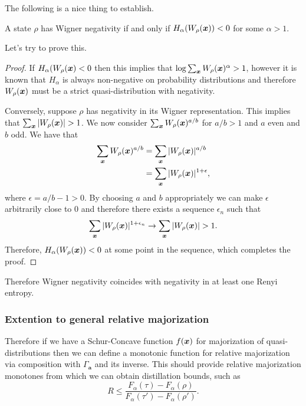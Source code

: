 \documentclass[pra,
aps,
twocolumn,
superscriptaddress,
groupedaddress,
nofootinbib,
reprint
]{revtex4-1}
\begin{document}
The following is a nice thing to establish.
\begin{theorem} A state $\rho$ has Wigner negativity if and only if $H_\alpha (W_\rho (\boldsymbol{x})) < 0$ for some $\alpha >1$.
\end{theorem}
Let's try to prove this.
\begin{proof} If $H_\alpha (W_\rho(\boldsymbol{x}) <0 $ then this implies that $\log \sum_{\boldsymbol{x}} W_\rho (\boldsymbol{x})^\alpha > 1$, however it is known that $H_\alpha$ is always non-negative on probability distributions and therefore $W_\rho(\boldsymbol{x})$ must be a strict quasi-distribution with negativity.

Conversely, suppose $\rho$ has negativity in its Wigner representation. This implies that $\sum_{\boldsymbol{x}} |W_\rho (\boldsymbol{x})| >1$. We now consider $\sum_{\boldsymbol{x}} W_\rho (\boldsymbol{x})^{a/b}$ for $a/b >1$ and $a$ even and $b$ odd. We have that
\begin{align}
\sum_{\boldsymbol{x}} W_\rho (\boldsymbol{x})^{a/b} &= \sum_{\boldsymbol{x}} |W_\rho (\boldsymbol{x})|^{a/b} \nonumber \\
&= \sum_{\boldsymbol{x}} |W_\rho (\boldsymbol{x})|^{1+ \epsilon},
\end{align}
where $\epsilon = a/b - 1 >0$. By choosing $a$ and $b$ appropriately we can make $\epsilon$ arbitrarily close to $0$ and therefore there exists a sequence $\epsilon_n$ such that
\begin{equation}
\sum_{\boldsymbol{x}} |W_\rho (\boldsymbol{x})|^{1+ \epsilon_n} \rightarrow \sum_{\boldsymbol{x}} |W_\rho (\boldsymbol{x})| >1.
\end{equation}
Therefore, $H_\alpha (W_\rho (\boldsymbol{x})) <0 $ at some point in the sequence, which completes the proof.
\end{proof}
Therefore Wigner negativity coincides with negativity in at least one Renyi entropy.
\subsubsection{Extention to general relative majorization}

Therefore if we have a Schur-Concave function $f(\boldsymbol{x})$ for majorization of quasi-distributions then we can define a monotonic function for relative majorization via composition with $\Gamma_{\mathbf{a}}$ and its inverse.
This should provide relative majorization monotones from which we can obtain distillation bounds, such as
\begin{equation}
R \le \frac{F_\alpha(\tau) - F_\alpha (\rho)}{F_\alpha(\tau') - F_\alpha (\rho')}.
\end{equation}
\end{document}

